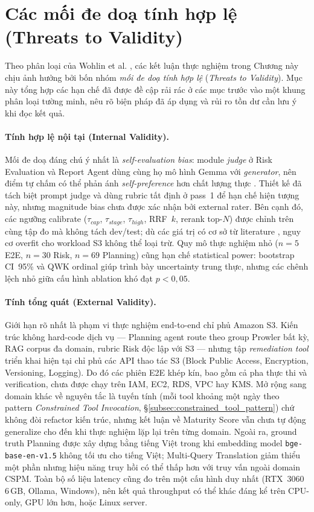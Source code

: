 \section{Các mối đe doạ tính hợp lệ (Threats to Validity)}
\label{subsec:threats_to_validity}

Theo phân loại của Wohlin et al. \cite{wohlin2012experimentation}, các kết luận thực nghiệm trong Chương này chịu ảnh hưởng bởi bốn nhóm \textit{mối đe doạ tính hợp lệ} (\textit{Threats to Validity}). Mục này tổng hợp các hạn chế đã được đề cập rải rác ở các mục trước vào một khung phân loại tường minh, nêu rõ biện pháp đã áp dụng và rủi ro tồn dư cần lưu ý khi đọc kết quả.

\paragraph*{Tính hợp lệ nội tại (Internal Validity).}
Mối đe doạ đáng chú ý nhất là \textit{self-evaluation bias}: module \textit{judge} ở Risk Evaluation và Report Agent dùng cùng họ mô hình Gemma với \textit{generator}, nên điểm tự chấm có thể phản ánh \textit{self-preference} hơn chất lượng thực \cite{panickssery2024llm_judge_bias}. Thiết kế đã tách biệt prompt judge và dùng rubric tất định ở pass~1 để hạn chế hiện tượng này, nhưng magnitude bias chưa được xác nhận bởi external rater. Bên cạnh đó, các ngưỡng calibrate ($\tau_{cap}$, $\tau_{stage}$, $\tau_{high}$, RRF~$k$, rerank top-$N$) được chỉnh trên cùng tập đo mà không tách dev/test; dù các giá trị có cơ sở từ literature \cite{cormack2009rrf,aws_smm}, nguy cơ overfit cho workload S3 không thể loại trừ. Quy mô thực nghiệm nhỏ ($n=5$ E2E, $n=30$ Risk, $n=69$ Planning) cũng hạn chế statistical power: bootstrap CI~95\% và QWK ordinal giúp trình bày uncertainty trung thực, nhưng các chênh lệch nhỏ giữa cấu hình ablation khó đạt $p<0{,}05$.

\paragraph*{Tính tổng quát (External Validity).}
Giới hạn rõ nhất là phạm vi thực nghiệm end-to-end chỉ phủ Amazon S3. Kiến trúc không hard-code dịch vụ --- Planning agent route theo group Prowler bất kỳ, RAG corpus đa domain, rubric Risk độc lập với S3 --- nhưng tập \textit{remediation tool} triển khai hiện tại chỉ phủ các API thao tác S3 (Block Public Access, Encryption, Versioning, Logging). Do đó các phiên E2E khép kín, bao gồm cả pha thực thi và verification, chưa được chạy trên IAM, EC2, RDS, VPC hay KMS. Mở rộng sang domain khác về nguyên tắc là tuyến tính (mỗi tool khoảng một ngày theo pattern \textit{Constrained Tool Invocation}, \S\ref{subsec:constrained_tool_pattern}) chứ không đòi refactor kiến trúc, nhưng kết luận về Maturity Score vẫn chưa tự động generalize cho đến khi thực nghiệm lặp lại trên từng domain. Ngoài ra, ground truth Planning được xây dựng bằng tiếng Việt trong khi embedding model \texttt{bge-base-en-v1.5} không tối ưu cho tiếng Việt; Multi-Query Translation giảm thiểu một phần nhưng hiệu năng truy hồi có thể thấp hơn với truy vấn ngoài domain CSPM. Toàn bộ số liệu latency cũng đo trên một cấu hình duy nhất (RTX~3060 6\,GB, Ollama, Windows), nên kết quả throughput có thể khác đáng kể trên CPU-only, GPU lớn hơn, hoặc Linux server.


